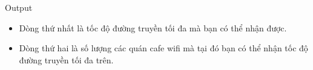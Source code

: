 Output
\begin{itemize}
	\item Dòng thứ nhất là tốc độ đường truyền tối đa mà bạn có thể nhận được.
	\item Dòng thứ hai là số lượng các quán cafe wifi mà tại đó bạn có thể nhận tốc độ đường truyền tối đa trên.
\end{itemize}